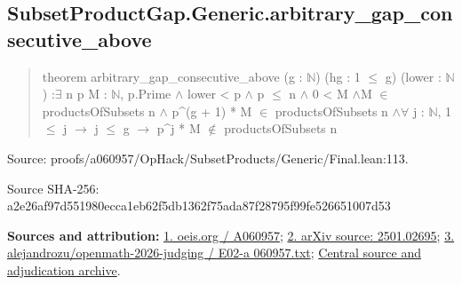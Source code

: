 \documentclass[11pt,a4paper]{article}
\begin{document}
\begin{samepage}
\subsection{SubsetProductGap.Generic.arbitrary\_gap\_consecutive\_above}
\begin{quote}\small\ttfamily theorem arbitrary\_gap\_consecutive\_above (g : \ensuremath{\mathbb{N}}) (hg : 1 \ensuremath{\leq} g) (lower : \ensuremath{\mathbb{N}}) :\newline     \ensuremath{\exists} n p M : \ensuremath{\mathbb{N}}, p.Prime \ensuremath{\wedge} lower < p \ensuremath{\wedge} p \ensuremath{\leq} n \ensuremath{\wedge} 0 < M \ensuremath{\wedge}\newline       M \ensuremath{\in} productsOfSubsets n \ensuremath{\wedge} p\textasciicircum{}(g + 1) * M \ensuremath{\in} productsOfSubsets n \ensuremath{\wedge}\newline         \ensuremath{\forall} j : \ensuremath{\mathbb{N}}, 1 \ensuremath{\leq} j \ensuremath{\to} j \ensuremath{\leq} g \ensuremath{\to} p\textasciicircum{}j * M \ensuremath{\notin} productsOfSubsets n\end{quote}
{\small Source: proofs/a060957/OpHack/SubsetProducts/Generic/Final.lean:113.\par}

{\small Source SHA-256: a2e26af97d551980ecca1eb62f5db1362f75ada87f28795f99fe526651007d53\par}

{\small\textbf{Sources and attribution:} \href{https://oeis.org/A060957}{1. oeis.org / A060957}; \href{https://arxiv.org/abs/2501.02695}{2. arXiv source: 2501.02695}; \href{https://github.com/alejandrozu/openmath-2026-judging/blob/d0ed487f487fa7ec814ff705ab55249983fe8707/OpenMath-Judging/review/entries/E02-a060957.txt}{3. alejandrozu/openmath-2026-judging / E02-a 060957.txt}; \href{https://github.com/alejandrozu/openmath-2026-judging}{Central source and adjudication archive}.\par}

\end{samepage}
\end{document}
